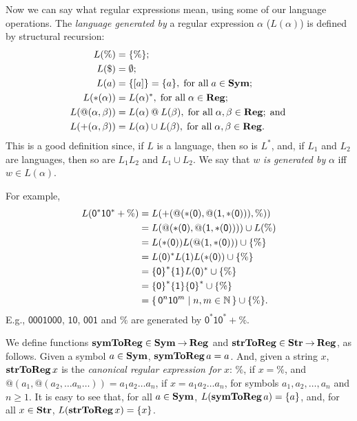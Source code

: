 Now we can say what regular expressions mean, using some of our
language operations.  The \emph{language generated by} a regular
expression $\alpha$ ($L(\alpha)$) is defined by structural recursion:
%
%
%
\begin{align*}
L(\%) &= \{\%\} ; \\
L(\$) &= \emptyset ; \\
L(a) &= \{[a]\} = \{a\}, \;\allowbreak\mbox{for all}\allowbreak\;a\in\mathbf{Sym} ; \\
L({*}(\alpha)) &= L(\alpha)^* , \;\allowbreak\mbox{for all}\allowbreak\;\alpha\in\mathbf{Reg} ; \\
L(@(\alpha,\beta)) &= L(\alpha)\mathbin{@} L(\beta) ,
\;\allowbreak\mbox{for all}\allowbreak\;\alpha,\beta\in\mathbf{Reg} ; \;\allowbreak\mbox{and}\allowbreak\; \\
L({+}(\alpha,\beta)) &= L(\alpha)\cup L(\beta) ,
\;\allowbreak\mbox{for all}\allowbreak\;\alpha,\beta\in\mathbf{Reg} .
\end{align*}
This is a good definition since, if $L$ is a language, then so is
$L^*$, and, if $L_1$ and $L_2$ are languages, then so are $L_1L_2$ and
$L_1\cup L_2$.  We say that $w$ \emph{is generated by} $\alpha$ iff
$w\in L(\alpha)$.

For example,
\begin{align*}
L(\mathsf{0^*10^*+\%}) &=
L(\mathsf{{+}(@({*}(0),@(1,{*}(0))),\%)}) \\
&= L(\mathsf{@({*}(0),@(1,{*}(0)))})\cup L(\%) \\
&= L(\mathsf{{*}(0)})L(\mathsf{@(1,{*}(0))})\cup \{\%\} \\
&= L(\mathsf{0})^* L(\mathsf{1}) L(\mathsf{{*}(0)}) \cup \{\%\} \\
&= \mathsf{\{0\}}^* \mathsf{\{1\}} L(\mathsf{0})^*
  \cup \{\%\} \\
&= \mathsf{\{0\}}^* \mathsf{\{1\}} \mathsf{\{0\}}^* 
  \cup \{\%\} \\
&= \{ \, {\mathsf 0}^n{\mathsf 1}{\mathsf 0}^m \mid n,m\in\mathbb{N} \, \} \cup
\{\%\} .
\end{align*}
E.g., $\mathsf{0001000}$, $\mathsf{10}$,
$\mathsf{001}$ and $\%$ are generated by $\mathsf{0^*10^*+\%}$.

We define functions $\mathbf{symToReg}\in\mathbf{Sym}\mathbin{\to}\mathbf{Reg}$ and
$\mathbf{strToReg}\in\mathbf{Str}\mathbin{\to}\mathbf{Reg}$, as follows.  Given a symbol $a\in\mathbf{Sym}$,
$\mathbf{symToReg}\,a = a$. And, given a string $x$, $\mathbf{strToReg}\,x$ is the
\emph{canonical regular expression for} $x$: $\%$, if $x = \%$, and
${@}(a_1, {@}(a_2, \ldots a_n \ldots)) = a_1a_2\ldots a_n$, if $x =
a_1a_2\ldots a_n$, for symbols $a_1,a_2,\ldots,a_n$ and $n\geq 1$.  It
is easy to see that, for all $a\in\mathbf{Sym}$, $L(\mathbf{symToReg}\,a)=\{a\}$, and,
for all $x\in\mathbf{Str}$, $L(\mathbf{strToReg}\,x)=\{x\}$.

